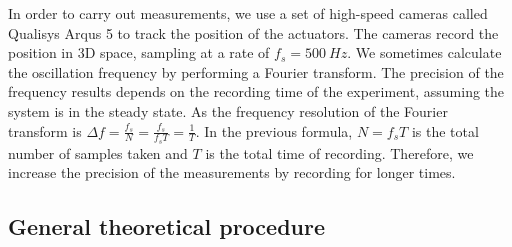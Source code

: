 \documentclass[11pt, a4paper]{article} %
\begin{document}
In order to carry out measurements, we use a set of high-speed cameras called Qualisys Arqus 5 to track the position of the actuators.
The cameras record the position in 3D space, sampling at a rate of $f_s = \SI{500}{Hz}$. %
We sometimes calculate the oscillation frequency by performing a Fourier transform. The precision of the frequency 
results depends on the recording time of the experiment, assuming the system is in the steady state. 
As the frequency resolution of the Fourier transform is $\varDelta f = \frac{f_s}{N} = \frac{f_s}{f_s T} = \frac{1}{T}$.
In the previous formula, $N=f_s T$ is the total number of samples taken and $T$ is the total time of recording. 
Therefore, we increase the precision of the measurements by recording for longer times. 




\subsection{General theoretical procedure}
\label{subsec:theoretical_procedure}
\end{document}
